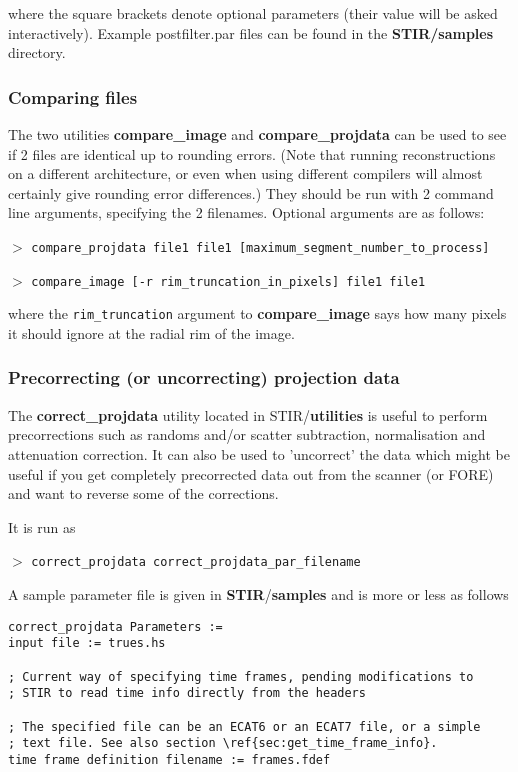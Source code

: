 \documentclass{article}
\newcommand{\cmdline}[1]{\par \noindent $>$ \texttt{#1}\par}
\begin{document}
{{where the square brackets denote optional parameters (their value 
will be asked interactively). Example postfilter.par files can 
be found in the \textbf{STIR/samples} directory.


\subsubsection{
Comparing files}

The two utilities \textbf{compare\_image} and \textbf{compare\_projdata} 
can be used to see if 2 files are identical up to rounding errors. 
(Note that running reconstructions on a different architecture, 
or even when using different compilers will almost certainly 
give rounding error differences.) They should be run with 2 command 
line arguments, specifying the 2 filenames. Optional arguments 
are as follows:
\cmdline{compare\_projdata file1 file1 
[maximum\_segment\_number\_to\_process]}
\cmdline{compare\_image [-r rim\_truncation\_in\_pixels] file1 file1}


where the \texttt{rim\_truncation} argument to \textbf{compare\_image}  says 
how many pixels it should ignore at the radial rim of the image.



\subsubsection{
Precorrecting (or uncorrecting) projection data}

The \textbf{correct\_projdata} utility located in STIR/\textbf{utilities} 
is useful to perform precorrections such as randoms and/or scatter 
subtraction, normalisation and attenuation correction. It can 
also be used to 'uncorrect' the data which might be useful if 
you get completely precorrected data out from the scanner (or 
FORE) and want to reverse some of the corrections.


It is run as
\cmdline{correct\_projdata correct\_projdata\_par\_filename}


A sample parameter file is given in \textbf{STIR}/\textbf{samples} and 
is more or less as follows

\begin{verbatim}
correct_projdata Parameters := 
input file := trues.hs

; Current way of specifying time frames, pending modifications to
; STIR to read time info directly from the headers

; The specified file can be an ECAT6 or an ECAT7 file, or a simple
; text file. See also section \ref{sec:get_time_frame_info}. 
time frame definition filename := frames.fdef


\end{verbatim}}}
\end{document}
